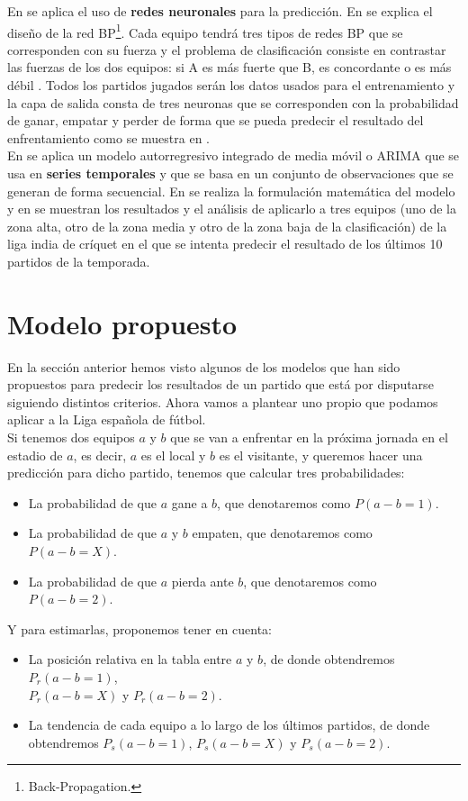 En \cite{refpred2} se aplica el uso de \textbf{redes neuronales} para la predicción. En \cite[Section 2.1.]{refpred2} se explica el diseño de la red BP\footnote{Back-Propagation.}. Cada equipo tendrá tres tipos de redes BP que se corresponden con su fuerza y el problema de clasificación consiste en contrastar las fuerzas de los dos equipos: si A es más fuerte que B, es concordante o es más débil \cite[Section 2.2.]{refpred2}. Todos los partidos jugados serán los datos usados para el entrenamiento \cite[Section 3.1.]{refpred2} y la capa de salida consta de tres neuronas que se corresponden con la probabilidad de ganar, empatar y perder \cite[Section 3.2.]{refpred2} de forma que se pueda predecir el resultado del enfrentamiento como se muestra en \cite[Section 3.4.]{refpred2}.\\

En \cite{refpred3} se aplica un modelo autorregresivo integrado de media móvil o ARIMA que se usa en \textbf{series temporales} y que se basa en un conjunto de observaciones que se generan de forma secuencial. En \cite[Section E]{refpred3} se realiza la formulación matemática del modelo y en \cite[Section F]{refpred3} se muestran los resultados y el análisis de aplicarlo a tres equipos (uno de la zona alta, otro de la zona media y otro de la zona baja de la clasificación) de la liga india de críquet en el que se intenta predecir el resultado de los últimos 10 partidos de la temporada.

\section{Modelo propuesto}
En la sección anterior hemos visto algunos de los modelos que han sido propuestos para predecir los resultados de un partido que está por disputarse siguiendo distintos criterios. Ahora vamos a plantear uno propio que podamos aplicar a la Liga española de fútbol.\\

Si tenemos dos equipos $a$ y $b$ que se van a enfrentar en la próxima jornada en el estadio de $a$, es decir, $a$ es el local y $b$ es el visitante, y queremos hacer una predicción para dicho partido, tenemos que calcular tres probabilidades:
\begin{itemize}
	\item La probabilidad de que $a$ gane a $b$, que denotaremos como $P(a-b=1)$.
	\item La probabilidad de que $a$ y $b$ empaten, que denotaremos como $P(a-b=X)$.
	\item La probabilidad de que $a$ pierda ante $b$, que denotaremos como $P(a-b=2)$.
\end{itemize}
Y para estimarlas, proponemos tener en cuenta:
\begin{itemize}
	\item La posición relativa en la tabla entre $a$ y $b$, de donde obtendremos $P_{r}(a-b=1)$,\\ $P_{r}(a-b=X)$ y $P_{r}(a-b=2)$.
	\item La tendencia de cada equipo a lo largo de los últimos partidos, de donde obtendremos $P_{s}(a-b=1)$, $P_{s}(a-b=X)$ y $P_{s}(a-b=2)$.
\end{itemize}
